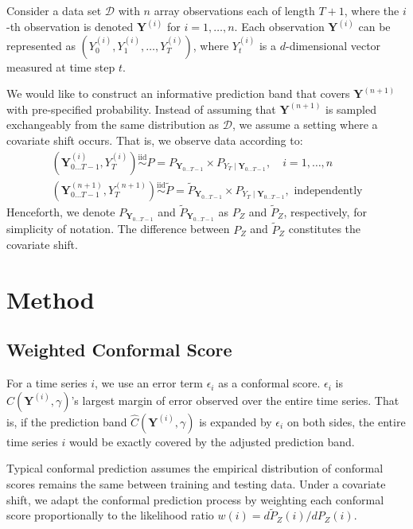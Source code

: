 \documentclass{article}
\numberwithin{equation}{section}
\begin{document}
Consider a data set $\mathcal{D}$ with $n$ array observations each of length $T+1$, where the $i$-th observation is denoted $\mathbf{Y}^{(i)}$ for $i = 1, \ldots, n$. Each observation $\mathbf{Y}^{(i)}$ can be represented as $(Y^{(i)}_0, Y^{(i)}_1, \ldots, Y^{(i)}_T)$, where $Y^{(i)}_t$ is a $d$-dimensional vector measured at time step $t$.

We would like to construct an informative prediction band that covers $\mathbf{Y}^{(n+1)}$ with pre-specified probability. Instead of assuming that $\mathbf{Y}^{(n+1)}$ is sampled exchangeably from the same distribution as $\mathcal{D}$, we assume a setting where a covariate shift occurs. That is, we observe data according to:
\begin{equation} \label{eq:1}
\begin{gathered}
(\mathbf{Y}^{(i)}_{0 \ldots T-1}, Y^{(i)}_T) \overset{\mathrm{iid}}{\sim} P = P_{\mathbf{Y}_{0 \ldots T-1}} \times P_{Y_T \mid \mathbf{Y}_{0 \ldots T-1}}, \quad i = 1, \ldots, n \\
(\mathbf{Y}^{(n+1)}_{0 \ldots T-1}, Y^{(n+1)}_T) \overset{\mathrm{iid}}{\sim} \widetilde{P} = \widetilde{P}_{\mathbf{Y}_{0 \ldots T-1}} \times P_{Y_T \mid \mathbf{Y}_{0 \ldots T-1}}, \text{ independently}
\end{gathered}
\end{equation}
Henceforth, we denote $P_{\mathbf{Y}_{0 \ldots T-1}}$ and $\widetilde{P}_{\mathbf{Y}_{0 \ldots T-1}}$ as $P_Z$ and $\widetilde{P}_Z$, respectively, for simplicity of notation. The difference between $P_Z$ and $\widetilde{P}_Z$ constitutes the covariate shift.

\section{Method}

\subsection{Weighted Conformal Score}

For a time series $i$, we use an error term $\epsilon_i$ as a conformal score. $\epsilon_i$ is $\hat{C}(\mathbf{Y}^{(i)}, \gamma)$'s largest margin of error observed over the entire time series. That is, if the prediction band $\hat{C}(\mathbf{Y}^{(i)}, \gamma)$ is expanded by $\epsilon_i$ on both sides, the entire time series $i$ would be exactly covered by the adjusted prediction band.

Typical conformal prediction assumes the empirical distribution of conformal scores remains the same between training and testing data. Under a covariate shift, we adapt the conformal prediction process by weighting each conformal score proportionally to the likelihood ratio $w(i) = d\widetilde{P}_Z(i) / dP_Z(i)$.
\end{document}
